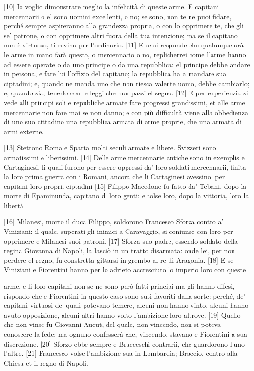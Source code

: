 {[}10{]} Io voglio dimonstrare meglio la infelicità di queste arme. E
capitani mercennarii o e' sono uomini excellenti, o no; se sono, non te
ne puoi fidare, perché sempre aspireranno alla grandezza propria, o con
lo opprimere te, che gli se' patrone, o con opprimere altri fuora della
tua intenzione; ma se il capitano non è virtuoso, ti rovina per
l'ordinario. {[}11{]} E se si responde che qualunque arà le arme in mano
farà questo, o mercennario o no, replicherrei come l'arme hanno ad
essere operate o da uno principe o da una repubblica: el principe debbe
andare in persona, e fare lui l'offizio del capitano; la repubblica ha a
mandare sua ciptadini; e, quando ne manda uno che non riesca valente
uomo, debbe cambiarlo; e, quando sia, tenerlo con le leggi che non passi
el segno. {[}12{]} E per experienzia si vede alli principi soli e
republiche armate fare progressi grandissimi, et alle arme mercennarie
non fare mai se non danno; e con più difficultà viene alla obbedienza di
uno suo cittadino una repubblica armata di arme proprie, che una armata
di armi externe.

{[}13{]} Stettono Roma e Sparta molti seculi armate e libere. Svizzeri
sono armatissimi e liberissimi. {[}14{]} Delle arme mercennarie antiche
sono in exemplis e Cartaginesi, li quali furono per essere oppressi da'
loro soldati mercennarii, finita la loro prima guerra con i Romani,
ancora che li Cartaginesi avessino, per capitani loro proprii ciptadini
{[}15{]} Filippo Macedone fu fatto da' Tebani, dopo la morte di
Epaminunda, capitano di loro genti: e tolse loro, dopo la vittoria, loro
la libertà

{[}16{]} Milanesi, morto il duca Filippo, soldorono Francesco Sforza
contro a' Viniziani: il quale, superati gli inimici a Caravaggio, si
coniunse con loro per opprimere e Milanesi suoi patroni. {[}17{]} Sforza
suo padre, essendo soldato della regina Giovanna di Napoli, la lasciò in
un tratto disarmata: onde lei, per non perdere el regno, fu constretta
gittarsi in grembo al re di Aragonia. {[}18{]} E se Viniziani e
Fiorentini hanno per lo adrieto accresciuto lo imperio loro con queste

\quebra

\noindent{}arme, e li loro capitani non se ne sono però fatti principi ma gli hanno
difesi, rispondo che e Fiorentini in questo caso sono suti favoriti
dalla sorte: perché, de' capitani virtuosi de' quali potevano temere,
alcuni non hanno vinto, alcuni hanno avuto opposizione, alcuni altri
hanno volto l'ambizione loro altrove.
{[}19{]} Quello che non vinse fu Giovanni Aucut, del quale, non
vincendo, non si poteva conoscere la fede: ma ognuno confesserà che,
vincendo, stavano e Fiorentini a sua discrezione. {[}20{]} Sforzo ebbe
sempre e Bracceschi contrarii, che guardorono l'uno l'altro. {[}21{]}
Francesco volse l'ambizione sua in Lombardia; Braccio, contro alla
Chiesa et il regno di Napoli.


